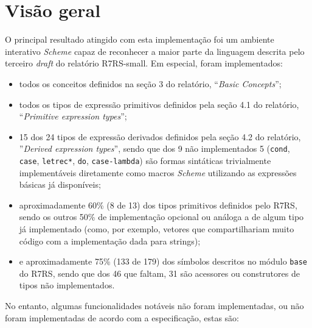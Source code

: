 \section{Visão geral}
\label{sec:introducao-resultados}

O principal resultado atingido com esta implementação foi um ambiente interativo
\textit{Scheme} capaz de reconhecer a maior parte da linguagem descrita pelo 
terceiro \textit{draft} do relatório \acs{R7RS}-small. Em especial, foram
implementados:

\begin{itemize}

\item todos os conceitos definidos na seção 3 do relatório, ``\textit{Basic
Concepts}'';

\item todos os tipos de expressão primitivos definidos pela seção 4.1 do
relatório, ``\textit{Primitive expression types}'';

\item 15 dos 24 tipos de expressão derivados definidos pela seção 4.2 do
relatório, ''\textit{Derived expression types}'', sendo que dos 9 não
implementados 5 (\texttt{cond}, \texttt{case}, \texttt{letrec*}, \texttt{do},
\texttt{case-lambda}) são formas sintáticas trivialmente implementáveis
diretamente como macros \textit{Scheme} utilizando as expressões básicas já
disponíveis;

\item aproximadamente 60\% (8 de 13) dos tipos primitivos definidos pelo \acs{R7RS}, sendo
 os outros 50\% de implementação opcional ou análoga a de algum tipo já
implementado (como, por exemplo, vetores que compartilhariam muito código com
a implementação dada para strings);

\item e aproximadamente 75\% (133 de 179) dos símbolos descritos no módulo
\texttt{base} do \acs{R7RS}, sendo que dos 46 que faltam, 31 são acessores ou
construtores de tipos não implementados.

\end{itemize}

No entanto, algumas funcionalidades notáveis não foram implementadas, ou não foram
implementadas de acordo com a especificação, estas são:

